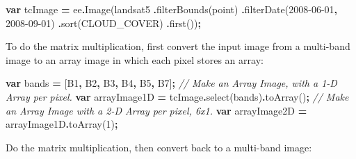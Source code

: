 \documentclass[
]{article}
\newenvironment{Shaded}{\begin{snugshade}}{\end{snugshade}}
\newcommand{\CommentTok}[1]{\textcolor[rgb]{0.56,0.35,0.01}{\textit{#1}}}
\newcommand{\DecValTok}[1]{\textcolor[rgb]{0.00,0.00,0.81}{#1}}
\newcommand{\FunctionTok}[1]{\textcolor[rgb]{0.00,0.00,0.00}{#1}}
\newcommand{\KeywordTok}[1]{\textcolor[rgb]{0.13,0.29,0.53}{\textbf{#1}}}
\newcommand{\NormalTok}[1]{#1}
\newcommand{\OperatorTok}[1]{\textcolor[rgb]{0.81,0.36,0.00}{\textbf{#1}}}
\newcommand{\StringTok}[1]{\textcolor[rgb]{0.31,0.60,0.02}{#1}}
\begin{document}
\begin{Shaded}
\begin{Highlighting}[]
\KeywordTok{var}\NormalTok{ tcImage }\OperatorTok{=}\NormalTok{ ee}\OperatorTok{.}\FunctionTok{Image}\NormalTok{(landsat5}
                       \OperatorTok{.}\FunctionTok{filterBounds}\NormalTok{(point)}
                       \OperatorTok{.}\FunctionTok{filterDate}\NormalTok{(}\StringTok{\textquotesingle{}2008{-}06{-}01\textquotesingle{}}\OperatorTok{,} \StringTok{\textquotesingle{}2008{-}09{-}01\textquotesingle{}}\NormalTok{)}
                       \OperatorTok{.}\FunctionTok{sort}\NormalTok{(}\StringTok{\textquotesingle{}CLOUD\_COVER\textquotesingle{}}\NormalTok{)}
                       \OperatorTok{.}\FunctionTok{first}\NormalTok{())}\OperatorTok{;}  
\end{Highlighting}
\end{Shaded}

To do the matrix multiplication, first convert the input image from a multi-band image to an array image in which each pixel stores an array:

\begin{Shaded}
\begin{Highlighting}[]
\KeywordTok{var}\NormalTok{ bands }\OperatorTok{=}\NormalTok{ [}\StringTok{\textquotesingle{}B1\textquotesingle{}}\OperatorTok{,} \StringTok{\textquotesingle{}B2\textquotesingle{}}\OperatorTok{,} \StringTok{\textquotesingle{}B3\textquotesingle{}}\OperatorTok{,} \StringTok{\textquotesingle{}B4\textquotesingle{}}\OperatorTok{,} \StringTok{\textquotesingle{}B5\textquotesingle{}}\OperatorTok{,} \StringTok{\textquotesingle{}B7\textquotesingle{}}\NormalTok{]}\OperatorTok{;}
\CommentTok{// Make an Array Image,  with a 1{-}D Array per pixel.}
\KeywordTok{var}\NormalTok{ arrayImage1D }\OperatorTok{=}\NormalTok{  tcImage}\OperatorTok{.}\FunctionTok{select}\NormalTok{(bands)}\OperatorTok{.}\FunctionTok{toArray}\NormalTok{()}\OperatorTok{;}
\CommentTok{// Make an Array Image  with a 2{-}D Array per pixel, 6x1.}
\KeywordTok{var}\NormalTok{ arrayImage2D }\OperatorTok{=}\NormalTok{ arrayImage1D}\OperatorTok{.}\FunctionTok{toArray}\NormalTok{(}\DecValTok{1}\NormalTok{)}\OperatorTok{;}  
\end{Highlighting}
\end{Shaded}

Do the matrix multiplication, then convert back to a multi-band image:
\end{document}

